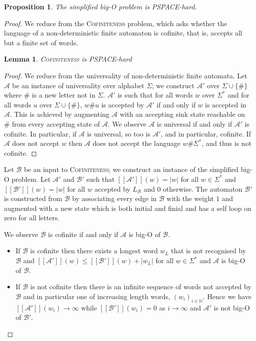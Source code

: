 \documentclass[10pt,a4paper]{amsart}
\newtheorem{lem}[lem]{Lemma}
\newtheorem{prop}[prop]{Proposition}
\theoremstyle{definition}
\numberwithin{equation}{section}
\theoremstyle{remark}
\newcommand{\autA}{\mathcal{A}}
\newcommand{\autB}{\mathcal{B}}
\newcommand{\brfunc}[1]{[\![#1]\!]}
\theoremstyle{remark}
\begin{document}
\begin{prop}\label{prop:hardness}
The simplified big-O problem is PSPACE-hard.
\end{prop}

\begin{proof}
We reduce from the  \textsc{Cofiniteness} problem, which asks whether the language of a non-deterministic finite automaton is cofinite, that is, accepts all but a finite set of words. 

\begin{lem}\label{prop:cofinitenesshardness}
\textsc{Cofiniteness} is PSPACE-hard 
\end{lem}
\begin{proof}
We reduce from the universality of non-deterministic finite automata. Let $\autA$ be an instance of universality over alphabet $\Sigma$; we construct $\autA'$ over $\Sigma\cup\{\#\}$ where $\#$ is a new letter not in $\Sigma$. $\autA'$ is such that for all words $w$ over $\Sigma^*$ and for all words $u$ over $\Sigma\cup\{\#\}$,   $w\#u$ is accepted by $\autA'$ if and only if $w$ is accepted in $\autA$. This is achieved by augmenting $\autA$ with an accepting sink state reachable on $\#$ from every accepting state of $\autA$. We observe $\autA$ is universal if and only if $\autA'$ is cofinite. In particular, if $\autA$ is universal, so too is $\autA'$, and in particular, cofinite. If $\autA$ does not accept $w$ then $\autA$ does not accept the language $w\#\Sigma^*$, and thus is not cofinite.
\end{proof}

Let $\autB$ be an input to \textsc{Cofiniteness}; we construct an instance of the simplified big-O problem. Let $\autA'$ and $\autB'$ such that $\brfunc{\autA'}(w) = |w|$ for all $w\in\Sigma^*$ and $\brfunc{\autB'}(w) = |w|$ for all $w$ accepted by $L_\autB$ and 0 otherwise. The automaton $\autB'$ is constructed from $\autB$ by associating every edge in $\autB$ with the weight $1$ and augmented with a new state which is both initial and finial and has a self loop on zero for all letters.

We observe $\autB$ is cofinite if and only if $\autA$ is big-O of $\autB$.
\begin{itemize}
    \item If $\autB$ is cofinite then there exists a longest word $w_L$ that is not recognised by $\autB$ and $\brfunc{\autA'}(w) \le \brfunc{\autB'}(w) + |w_L|$ for all $w\in\Sigma^*$ and $\autA$ is big-O of $\autB$. 
    \item If $\autB$ is not cofinite then there is an infinite sequence of words not accepted by $\autB$ and in particular one of increasing length words, $(w_i)_{i\in \mathbb{N}}$. Hence we have $\brfunc{\autA'}(w_i) \to \infty$ while $\brfunc{\autB'}(w_i) = 0$ as $i\to\infty$ and $\autA'$ is not big-O of $\autB'$.\qedhere
\end{itemize}
\end{proof}
\end{document}
